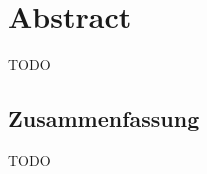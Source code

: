 \documentclass[../thesis.tex]{subfiles}
\begin{document}
\graphicspath{{../}}

\chapter*{Abstract}

TODO

\begin{otherlanguage}{ngerman}
\chapter*{Zusammenfassung}

TODO

\end{otherlanguage}
\end{document}
